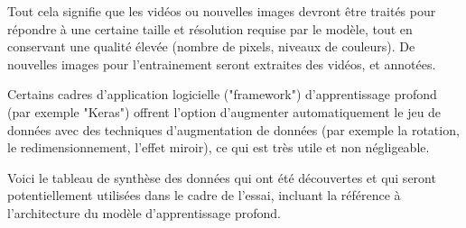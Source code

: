 \par Tout cela signifie que les vidéos ou nouvelles images devront être traités pour répondre à une certaine taille et résolution requise par le modèle, tout en conservant une qualité élevée (nombre de pixels, niveaux de couleurs). De nouvelles images pour l'entrainement seront extraites des vidéos, et annotées. 
\par Certains cadres d'application logicielle ("framework") d'apprentissage profond (par exemple "Keras") offrent l'option d'augmenter automatiquement le jeu de données avec des techniques d'augmentation de données (par exemple la rotation, le redimensionnement, l'effet miroir), ce qui est très utile et non négligeable.
\par Voici le tableau de synthèse des données qui ont été découvertes et qui seront potentiellement utilisées dans le cadre de l'essai, incluant la référence à l'architecture du modèle d'apprentissage profond.
